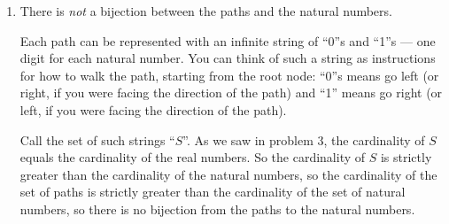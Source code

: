 \documentclass[12pt,a4paper]{article}
\begin{document}
\begin{enumerate}
\item There is \emph{not} a bijection between the paths and the natural numbers. 

Each path can be represented with an infinite string of ``0''s and ``1''s --- one digit for each natural number. You can think of such a string as instructions for how to walk the path, starting from the root node: ``0''s means go left (or right, if you were facing the direction of the path) and ``1'' means go right (or left, if you were facing the direction of the path).

Call the set of such strings ``$S$''. As we saw in problem 3, the cardinality of $S$ equals the cardinality of the real numbers. So the cardinality of $S$ is strictly greater than the cardinality of the natural numbers, so the cardinality of the set of paths is strictly greater than the cardinality of the set of natural numbers, so there is no bijection from the paths to the natural numbers.

\end{enumerate}
\end{document}
